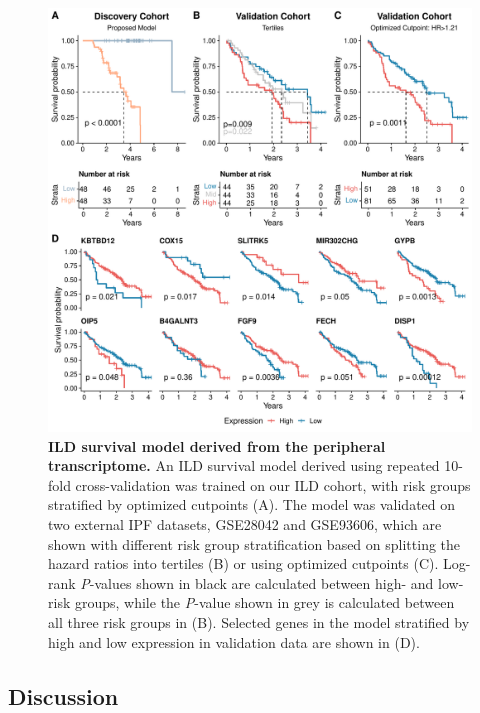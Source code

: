 \documentclass[
]{article}
\begin{document}
\begin{figure}

{\centering \includegraphics[width=0.89\linewidth,]{./Figures/BloodRNAseq/PPF_survival_v2} 

}

\caption[ILD survival model]{\textbf{ILD survival model derived from the peripheral transcriptome.} An ILD survival model derived using repeated 10-fold cross-validation was trained on our ILD cohort, with risk groups stratified by optimized cutpoints (A). The model was validated on two external IPF datasets, GSE28042 and GSE93606, which are shown with different risk group stratification based on splitting the hazard ratios into tertiles (B) or using optimized cutpoints (C). Log-rank \textit{P}-values shown in black are calculated between high- and low- risk groups, while the \textit{P}-value shown in grey is calculated between all three risk groups in (B). Selected genes in the model stratified by high and low expression in validation data are shown in (D).}\label{fig:ildsurvival}
\end{figure}

\subsection{Discussion}\label{discussion-2}
\end{document}

